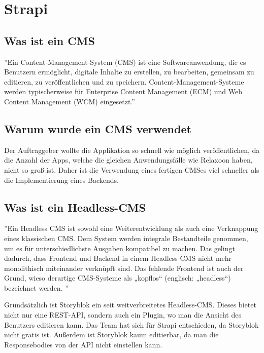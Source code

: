 \section{Strapi}

\subsection{Was ist ein CMS}

''Ein Content-Management-System (CMS) ist eine Softwareanwendung,
die es Benutzern ermöglicht, digitale Inhalte zu erstellen, zu bearbeiten, gemeinsam zu editieren,
zu veröffentlichen und zu speichern. Content-Management-Systeme werden typischerweise für Enterprise
Content Management (ECM) und Web Content Management (WCM) eingesetzt.''
\cite{cms}



\subsection{Warum wurde ein CMS verwendet}
Der Auftraggeber wollte die Applikation so schnell wie möglich veröffentlichen,
da die Anzahl der Apps, welche die gleichen Anwendungsfälle wie Relaxoon haben,
nicht so groß ist.
Daher ist die Verwendung eines fertigen CMSes viel schneller als
die Implementierung eines Backends.

\subsection{Was ist ein Headless-CMS}
''Ein Headless CMS ist sowohl eine Weiterentwicklung als
auch eine Verknappung eines klassischen CMS. Dem System
werden integrale Bestandteile genommen, um es für
unterschiedlichste Ausgaben kompatibel zu machen.
Das gelingt dadurch, dass Frontend und Backend in einem
Headless CMS nicht mehr monolithisch miteinander verknüpft
sind. Das fehlende Frontend ist auch der Grund,
wieso derartige CMS-Systeme als
„kopflos“ (englisch: „headless“) bezeichnet werden.
'' \cite{headles-cms}

Grundsätzlich ist Storyblok ein seit weitverbreitetes Headless-CMS. Dieses bietet nicht nur eine REST-API, sondern auch ein Plugin, wo man die Ansicht des Benutzers editieren kann.
Das Team hat sich für Strapi entschieden, da Storyblok nicht gratis ist. Außerdem ist Storyblok kaum editierbar, da man die Responsebodies von der API nicht einstellen kann. \cite[]{storyblok-bad}

